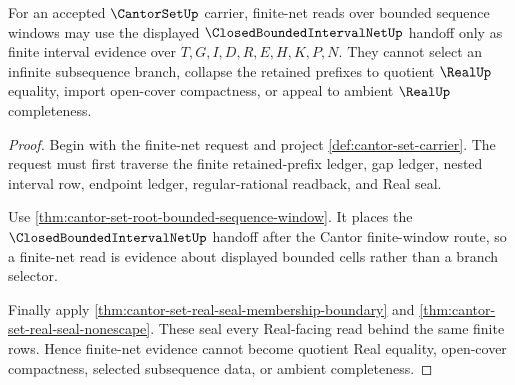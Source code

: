 \begin{theorem}
\label{thm:cantor-set-root-finite-net-subsequence-refusal}
For an accepted $\CantorSetUp$ carrier, finite-net reads over bounded sequence windows may use the displayed $\ClosedBoundedIntervalNetUp$ handoff only as finite interval evidence over $T,G,I,D,R,E,H,K,P,N$. They cannot select an infinite subsequence branch, collapse the retained prefixes to quotient $\RealUp$ equality, import open-cover compactness, or appeal to ambient $\RealUp$ completeness.
\end{theorem}
\begin{proof}
Begin with the finite-net request and project \autoref{def:cantor-set-carrier}. The request must first traverse the finite retained-prefix ledger, gap ledger, nested interval row, endpoint ledger, regular-rational readback, and Real seal.

Use \autoref{thm:cantor-set-root-bounded-sequence-window}. It places the $\ClosedBoundedIntervalNetUp$ handoff after the Cantor finite-window route, so a finite-net read is evidence about displayed bounded cells rather than a branch selector.

Finally apply \autoref{thm:cantor-set-real-seal-membership-boundary} and \autoref{thm:cantor-set-real-seal-nonescape}. These seal every Real-facing read behind the same finite rows. Hence finite-net evidence cannot become quotient Real equality, open-cover compactness, selected subsequence data, or ambient completeness.
\end{proof}

